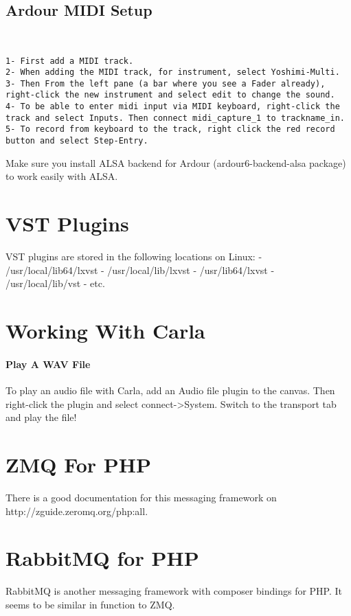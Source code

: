 \documentclass{article}
\begin{document}
\subsection{Ardour MIDI Setup}
\begin{verbatim}


1- First add a MIDI track.
2- When adding the MIDI track, for instrument, select Yoshimi-Multi.
3- Then From the left pane (a bar where you see a Fader already), right-click the new instrument and select edit to change the sound.
4- To be able to enter midi input via MIDI keyboard, right-click the track and select Inputs. Then connect midi_capture_1 to trackname_in.
5- To record from keyboard to the track, right click the red record button and select Step-Entry.
\end{verbatim}

Make sure you install ALSA backend for Ardour (ardour6-backend-alsa package) to work easily with ALSA. 


\section{VST Plugins}
VST plugins are stored in the following locations on Linux:
- /usr/local/lib64/lxvst
- /usr/local/lib/lxvst
- /usr/lib64/lxvst
- /usr/local/lib/vst
- etc.



\section{Working With Carla}

\paragraph{Play A WAV File}

To play an audio file with Carla, add an Audio file plugin to the canvas. Then right-click the plugin and select connect->System. Switch to the transport tab and play the file!

\section{ZMQ For PHP}
There is a good documentation for this messaging framework on http://zguide.zeromq.org/php:all.
\section{RabbitMQ for PHP}
RabbitMQ is another messaging framework with composer bindings for PHP. It seems to be similar in function to ZMQ.
\end{document}
